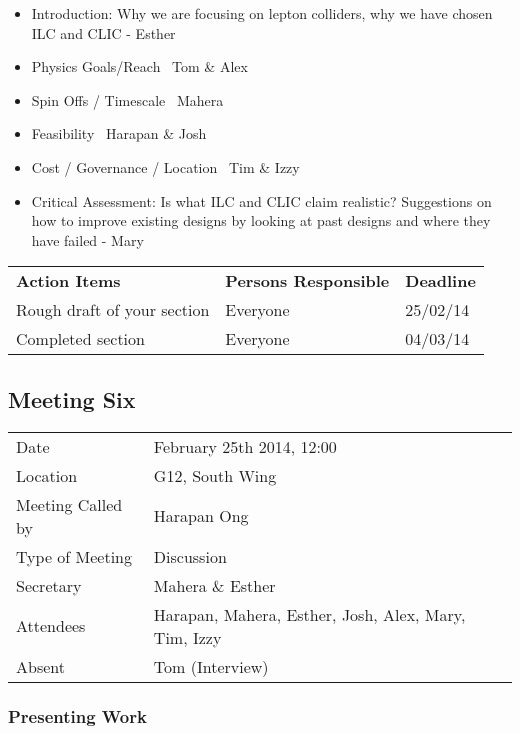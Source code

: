 \begin{itemize}
\item Introduction: Why we are focusing on lepton colliders, why we have chosen ILC and CLIC - Esther
\item  Physics Goals/Reach  \textemdash \, Tom \& Alex
\item  Spin Offs / Timescale  \textemdash \, Mahera
\item  Feasibility  \textemdash \, Harapan \& Josh
\item  Cost / Governance / Location  \textemdash \, Tim \& Izzy
\item  Critical Assessment: Is what ILC and CLIC claim realistic? Suggestions on how to improve existing designs by looking at past designs and where they have failed - Mary
\end{itemize}

\begin{tabularx}{\textwidth}{X p{4.5cm} p{1.2cm}}
  \textbf{Action Items} & \textbf{Persons Responsible} & \textbf{Deadline} \\

Rough draft of your section
& Everyone &
25/02/14 \\

Completed section
& Everyone &
04/03/14 \\

\end{tabularx}

\subsection{Meeting Six}

\begin{tabular}{l l}
  Date & February 25th 2014, 12:00 \\
  Location & G12, South Wing \\
  Meeting Called by & Harapan Ong \\
  Type of Meeting & Discussion \\
  Secretary & Mahera \& Esther \\
  Attendees & Harapan, Mahera, Esther, Josh, Alex, Mary, Tim, Izzy \\
  Absent & Tom (Interview) \\  
\end{tabular}

\subsubsection{Presenting Work}

